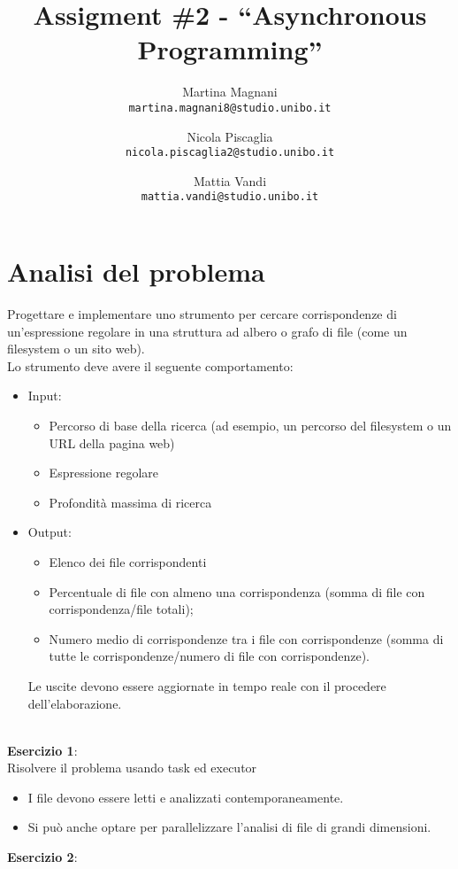 \documentclass[a4paper]{article}
\title{\LARGE \bf
Assigment \#2 - ``Asynchronous Programming''
}
\author{
    Martina Magnani\\
    \texttt{martina.magnani8@studio.unibo.it}
    \and
    Nicola Piscaglia\\
    \texttt{nicola.piscaglia2@studio.unibo.it}
    \and
    Mattia Vandi\\
    \texttt{mattia.vandi@studio.unibo.it}
}
\date{}
\begin{document}
\maketitle
\section{Analisi del problema}\label{analisi-del-problema}

Progettare e implementare uno strumento per cercare corrispondenze di un'espressione regolare in una struttura ad albero o grafo di file (come un filesystem o un sito web).\\
Lo strumento deve avere il seguente comportamento:
\begin{itemize}
    \item Input\label{input}:
        \begin{itemize}
            \item Percorso di base della ricerca (ad esempio, un percorso del filesystem o un URL della pagina web)
            \item Espressione regolare
            \item Profondità massima di ricerca
        \end{itemize}
    \item Output\label{output}:
        \begin{itemize}
            \item Elenco dei file corrispondenti
            \item Percentuale di file con almeno una corrispondenza (somma di file con corrispondenza/file totali);
            \item Numero medio di corrispondenze tra i file con corrispondenze (somma di tutte le corrispondenze/numero di file con corrispondenze).
        \end{itemize}
        Le uscite devono essere aggiornate in tempo reale con il procedere dell'elaborazione.
\end{itemize}
\\
\textbf{Esercizio 1}:\\
Risolvere il problema usando task ed executor
        \begin{itemize}
            \item I file devono essere letti e analizzati contemporaneamente.
            \item Si può anche optare per parallelizzare l'analisi di file di grandi dimensioni.
        \end{itemize}
\textbf{Esercizio 2}:\\
\end{document}
